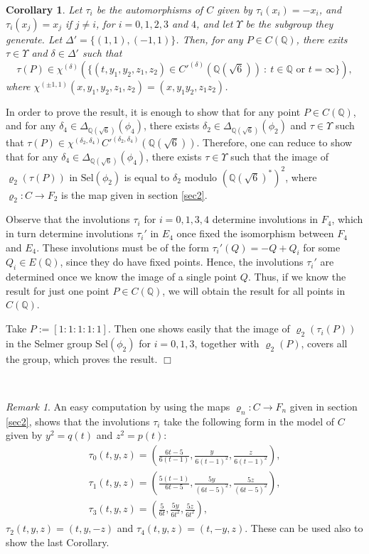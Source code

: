 \documentclass[a4paper,12pt]{amsart}
\newtheorem{cor}[thm]{Corollary}
\theoremstyle{remark}
\newtheorem{rem}[thm]{Remark}
\theoremstyle{definition}
\newenvironment{pf}{\par\noindent{\bf Proof.}\enspace\ignorespaces}{{\hfill $\Box$}\par\par}
\begin{document}
\begin{cor}\label{deltaCinv} Let $\tau_i$ be the automorphisms of $C$ given by $\tau_i(x_i)=-x_i$,
and $\tau_i(x_j)=x_j$ if $j\ne i$, for $i=0,1,2,3$ and $4$, and
let $\Upsilon$ be the subgroup they generate. Let $\Delta'=\{ (1,1),(-1,1)\}$. Then, for any $P\in C({{\mathbb{Q}}})$,
there exits $\tau \in \Upsilon$ and $\delta\in \Delta'$ such that
$$\tau(P) \in \chi^{(\delta)}(\{(t,y_1,y_2,z_1,z_2)\in C'^{(\delta)}({{\mathbb{Q}}}(\sqrt{6}))\ : \
t\in {{\mathbb{Q}}}  \mbox{ or } t=\infty \}),$$ where $\chi^{(\pm 1
,1)}(x,y_1,y_2,z_1,z_2)=(x,y_1y_2,z_1z_2)$.
\end{cor}

\begin{pf}
In order to prove the result, it is enough to show that for any point
$P\in C({{\mathbb{Q}}})$, and for any $\delta_4\in
\Delta_{{{\mathbb{Q}}}(\sqrt{6})}(\phi_4)$, there exists $\delta_2\in
\Delta_{{{\mathbb{Q}}}(\sqrt{6})}(\phi_2)$ and $\tau\in \Upsilon$ such that
$\tau(P)\in
\chi^{(\delta_2,\delta_4)}C'^{(\delta_2,\delta_4)}({{\mathbb{Q}}}(\sqrt{6}))$.
Therefore, one can reduce to show that for any  $\delta_4\in
\Delta_{{{\mathbb{Q}}}(\sqrt{6})}(\phi_4)$, there exists $\tau\in \Upsilon$
such that the image of $\varrho_2(\tau(P))$ in
$\mbox{Sel}(\phi_2)$ is equal to $\delta_2$ modulo
$({{\mathbb{Q}}}(\sqrt{6})^*)^2$, where $\varrho_2: C\to F_2$ is the map
given in section \ref{sec2}.

Observe that the involutions $\tau_i$ for $i=0,1,3,4$ determine
involutions in $F_4$, which in turn determine involutions
$\tau_i'$ in $E_4$ once fixed the isomorphism between $F_4$ and
$E_4$. These involutions must be of the form $\tau_i'(Q)=-Q+Q_i$
for some $Q_i\in E({{\mathbb{Q}}})$, since they do have fixed points. Hence,
the involutions $\tau_i'$ are determined once we know the image of
a single point $Q$. Thus, if we know the result for just one point
$P\in C({{\mathbb{Q}}})$, we will obtain the result for all points in
$C({{\mathbb{Q}}})$.

Take $P:=[1:1:1:1:1]$. Then one shows easily that the image of
$\varrho_2(\tau_i(P))$ in the Selmer group $\mbox{Sel}(\phi_2)$
for $i=0,1,3$, together with $\varrho_2(P)$, covers all the group,
which proves the result.
\end{pf}

\
\begin{rem} An easy computation by using the maps $\varrho_n: C\to
F_n$ given in section \ref{sec2}, shows that the involutions $\tau_i$ take
the following form in the model of $C$ given by $y^2=q(t)$ and
$z^2=p(t)$:
$$
\begin{array}{l}
\tau_0(t,y,z)=\left(\frac{6t-5}{6(t-1)},\frac{y}{6(t-1)^2},\frac{z}{6(t-1)^2}\right),\\[2mm]
\tau_1(t,y,z)=\left(\frac{5(t-1)}{6t-5},\frac{5y}{(6t-5)^2},\frac{5z}{(6t-5)^2}\right),\\[2mm]
\tau_3(t,y,z)=\left(\frac{5}{6t},\frac{5 y}{6t^2},\frac{5
z}{6t^2}\right),
\end{array}
$$
$\tau_2(t,y,z)=(t,y,-z)$ and $\tau_4(t,y,z)=(t,-y,z)$. These can
be used also to show the last Corollary.
\end{rem}
\end{document}
